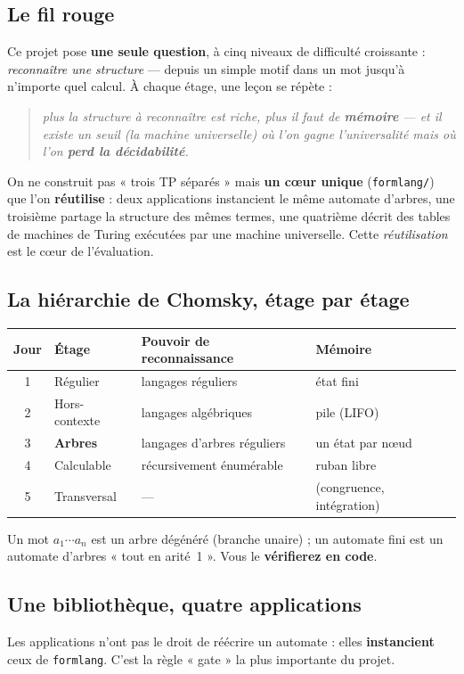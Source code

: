 \documentclass[11pt,a4paper]{scrartcl}
\begin{document}
\subsection{Le fil rouge}
Ce projet pose \textbf{une seule question}, à cinq niveaux de difficulté croissante :
\emph{reconnaître une structure} — depuis un simple motif dans un mot jusqu'à
n'importe quel calcul. À chaque étage, une leçon se répète :
\begin{quote}\itshape
plus la structure à reconnaître est riche, plus il faut de \textbf{mémoire} — et il
existe un seuil (la machine universelle) où l'on gagne l'universalité mais où l'on
\textbf{perd la décidabilité}.
\end{quote}
On ne construit pas « trois TP séparés » mais \textbf{un cœur unique} (\texttt{formlang/})
que l'on \textbf{réutilise} : deux applications instancient le même automate d'arbres, une
troisième partage la structure des mêmes termes, une quatrième décrit des tables de
machines de Turing exécutées par une machine universelle. Cette \emph{réutilisation}
est le cœur de l'évaluation.

\subsection{La hiérarchie de Chomsky, étage par étage}
\begin{center}\small
\begin{tabular}{@{}clll@{}}
\toprule
Jour & Étage & Pouvoir de reconnaissance & Mémoire \\\midrule
1 & Régulier & langages réguliers & état fini \\
2 & Hors-contexte & langages algébriques & pile (LIFO) \\
3 & \textbf{Arbres} & langages d'arbres réguliers & un état par nœud \\
4 & Calculable & récursivement énumérable & ruban libre \\
5 & Transversal & — & (congruence, intégration) \\
\bottomrule
\end{tabular}
\end{center}
\noindent Un mot $a_1\cdots a_n$ est un arbre dégénéré (branche unaire) ; un automate fini
est un automate d'arbres « tout en arité~1 ». Vous le \textbf{vérifierez en code}.

\subsection{Une bibliothèque, quatre applications}
Les applications n'ont pas le droit de réécrire un automate : elles \textbf{instancient}
ceux de \texttt{formlang}. C'est la règle « gate » la plus importante du projet.
\end{document}
